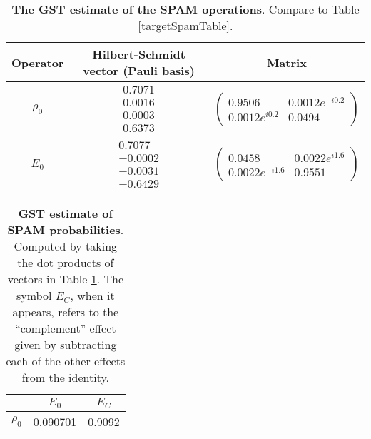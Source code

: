 \documentclass{article}[11pt]
\begin{document}
\begin{table}[h]
\begin{center}
\begin{tabular}[l]{|c|c|c|}
\hline
Operator & Hilbert-Schmidt vector (Pauli basis) & Matrix \\ \hline
$\rho_{0}$ & $ \begin{array}{c}
0.7071 \\ 
0.0016 \\ 
0.0003 \\ 
0.6373
 \end{array} $
 & $ \left(\!\!\begin{array}{cc}
0.9506 & 0.0012e^{-i0.2} \\ 
0.0012e^{i0.2} & 0.0494
 \end{array}\!\!\right) $
 \\ \hline
$E_{0}$ & $ \begin{array}{c}
0.7077 \\ 
-0.0002 \\ 
-0.0031 \\ 
-0.6429
 \end{array} $
 & $ \left(\!\!\begin{array}{cc}
0.0458 & 0.0022e^{i1.6} \\ 
0.0022e^{-i1.6} & 0.9551
 \end{array}\!\!\right) $
 \\ \hline
\end{tabular}

\caption{\textbf{The GST estimate of the SPAM operations}.  Compare to Table \ref{targetSpamTable}.\label{bestGatesetSpamTable}}
\end{center}
\end{table}

\begin{table}[h]
\begin{center}
\begin{tabular}[l]{|c|c|c|}
\hline
 & $E_{0}$ & $E_C$ \\ \hline
$\rho_{0}$ & 0.090701 & 0.9092 \\ \hline
\end{tabular}

\caption{\textbf{GST estimate of SPAM probabilities}.  Computed by taking the dot products of vectors in Table \ref{bestGatesetSpamTable}.  The symbol $E_C$, when it appears, refers to the ``complement'' effect given by subtracting each of the other effects from the identity.\label{bestGatesetSpamParametersTable}}
\end{center}
\end{table}
\end{document}
